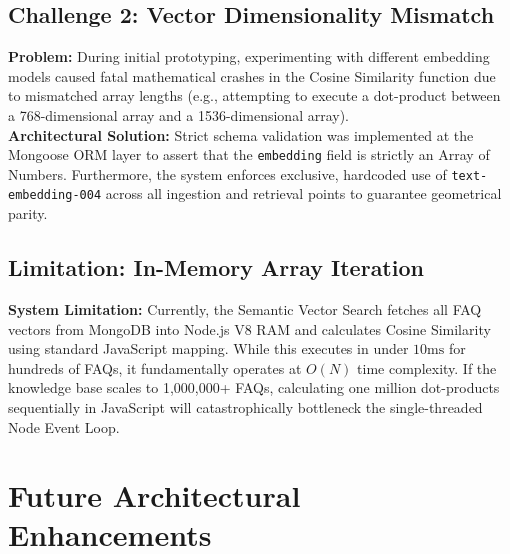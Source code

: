 \documentclass[12pt,a4paper]{article}
\begin{document}
\subsection{Challenge 2: Vector Dimensionality Mismatch}
\textbf{Problem:} During initial prototyping, experimenting with different embedding models caused fatal mathematical crashes in the Cosine Similarity function due to mismatched array lengths (e.g., attempting to execute a dot-product between a 768-dimensional array and a 1536-dimensional array). \\
\textbf{Architectural Solution:} Strict schema validation was implemented at the Mongoose ORM layer to assert that the \texttt{embedding} field is strictly an Array of Numbers. Furthermore, the system enforces exclusive, hardcoded use of \texttt{text-embedding-004} across all ingestion and retrieval points to guarantee geometrical parity.

\subsection{Limitation: In-Memory Array Iteration}
\textbf{System Limitation:} Currently, the Semantic Vector Search fetches all FAQ vectors from MongoDB into Node.js V8 RAM and calculates Cosine Similarity using standard JavaScript mapping. While this executes in under $10\text{ms}$ for hundreds of FAQs, it fundamentally operates at $O(N)$ time complexity. If the knowledge base scales to 1,000,000+ FAQs, calculating one million dot-products sequentially in JavaScript will catastrophically bottleneck the single-threaded Node Event Loop.

\newpage

\section{Future Architectural Enhancements}
\vspace{0.5cm}
\end{document}
